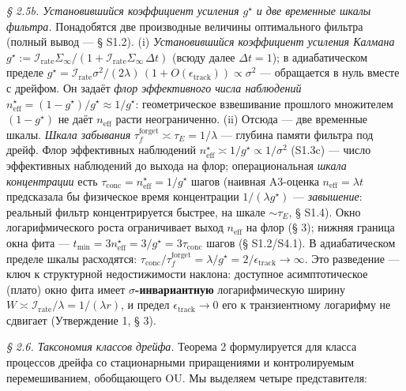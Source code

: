 \documentclass[12pt]{iopart}
\begin{document}
\emph{§ 2.5b. Установившийся коэффициент усиления \(g^\star\) и две временные шкалы фильтра.} Понадобятся две производные величины оптимального фильтра (полный вывод --- § S1.2). (i) \emph{Установившийся коэффициент усиления Калмана} \(g^\star := \mathcal I_{\text{rate}}\Sigma_\infty/(1+\mathcal I_{\text{rate}}\Sigma_\infty\,\Delta t)\) (всюду далее \(\Delta t = 1\)); в адиабатическом пределе \(g^\star = \mathcal I_{\text{rate}}\sigma^2/(2\lambda)\, (1+O(\epsilon_{\text{track}})) \propto \sigma^2\) --- обращается в нуль вместе с дрейфом. Он задаёт \emph{флор эффективного числа наблюдений} \(n_{\text{eff}}^\star = (1-g^\star)/g^\star \approx 1/g^\star\): геометрическое взвешивание прошлого множителем \((1-g^\star)\) не даёт \(n_{\text{eff}}\) расти неограниченно. (ii) Отсюда --- две временные шкалы. \emph{Шкала забывания} \(\tau_f^{\text{forget}} \asymp \tau_E = 1/\lambda\) --- глубина памяти фильтра под дрейф. Флор эффективных наблюдений \(n_{\text{eff}}^\star \asymp 1/g^\star \propto 1/\sigma^2\) (S1.3c) --- число эффективных наблюдений до выхода на флор; операциональная \emph{шкала концентрации} есть \(\tau_{\text{conc}} = n_{\text{eff}}^\star = 1/g^\star\) шагов (наивная A3-оценка \(n_{\text{eff}} = \lambda t\) предсказала бы физическое время концентрации \(1/(\lambda g^\star)\) --- \emph{завышение}: реальный фильтр концентрируется быстрее, на шкале \(\sim\tau_E\), § S1.4). Окно логарифмического роста ограничивает выход \(n_{\text{eff}}\) на флор (§ 3); нижняя граница окна фита --- \(t_{\min} = 3n_{\text{eff}}^\star = 3/g^\star = 3\tau_{\text{conc}}\) шагов (§ S1.2/S4.1). В адиабатическом пределе шкалы расходятся: \(\tau_{\text{conc}}/\tau_f^{\text{forget}} = \lambda/g^\star = 2/\epsilon_{\text{track}} \to \infty\). Это разведение --- ключ к структурной недостижимости наклона: доступное асимптотическое (плато) окно фита имеет \textbf{\(\sigma\)-инвариантную} логарифмическую ширину \(W \asymp \mathcal I_{\text{rate}}/\lambda = 1/(\lambda r)\), и предел \(\epsilon_{\text{track}}\to0\) его к транзиентному логарифму не сдвигает (Утверждение 1, § 3).



\emph{§ 2.6. Таксономия классов дрейфа.} Теорема 2 формулируется для класса процессов дрейфа со стационарными приращениями и контролируемым перемешиванием, обобщающего OU. Мы выделяем четыре представителя:
\end{document}
